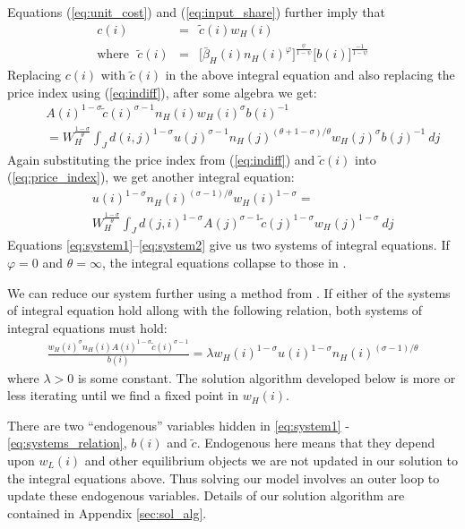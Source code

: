 \documentclass{article}
\begin{document}
Equations (\ref{eq:unit_cost}) and (\ref{eq:input_share}) further imply that 
\begin{eqnarray}\label{eq:ctilde}
	c(i) & = & \tilde{c}(i) w_H(i) \nonumber \\
    \mbox{where}~~~ \tilde{c}(i) & = & 
	\Big[\bar{\beta}_H(i) n_H(i)^{\varphi}\Big] ^{\frac{\psi}{1-\psi}} \Big[b(i)\Big]^{\frac{-1}{1-\psi}}
\end{eqnarray}
Replacing $c(i)$ with $\tilde{c}(i)$ in the above integral equation and also replacing the price index using (\ref{eq:indiff}), after some algebra we get:
\begin{eqnarray}\label{eq:system1}
	& & A(i)^{1-\sigma} \tilde{c}(i)^{\sigma-1} n_H(i)  w_H(i)^{\sigma}  b(i)^{-1}  \nonumber \\
	& & =  
    W_H^{\frac{1-\sigma}{\theta}}
	\int_J d(i,j)^{1-\sigma} u(j)^{\sigma-1} n_H(j)^{(\theta+1-\sigma)/\theta} w_H(j)^{\sigma} b(j)^{-1}  ~dj
\end{eqnarray}
Again substituting the price index from (\ref{eq:indiff}) and $\tilde{c}(i)$ into (\ref{eq:price_index}), we get another integral equation: 
\begin{eqnarray}\label{eq:system2}
 	& &  u(i)^{1-\sigma} n_H(i)^{(\sigma-1)/\theta} w_H(i)^{1-\sigma}  = \nonumber \\ 
 	& & 
    W_H^{\frac{1-\sigma}{\theta}}
 	\int_J  d(j,i)^{1-\sigma} A(j)^{\sigma-1}  \tilde{c}(j)^{1-\sigma} w_H(j)^{1-\sigma}
 	~ dj
\end{eqnarray}
Equations \ref{eq:system1}--\ref{eq:system2} give us two systems of integral equations. If $\varphi=0$ and $\theta=\infty$, the integral equations collapse to those in \citet{allen2014trade}. 

We can reduce our system further using a method from \citet{allen2014trade}.  If either of the systems of integral equation hold allong with the following relation, both systems of integral equations must hold:
\begin{eqnarray}\label{eq:systems_relation}
	\frac{w_H(i)^{\sigma}n_H(i)A(i)^{1-\sigma}\tilde{c}(i)^{\sigma-1}}{b(i)} = \lambda w_H(i)^{1-\sigma} u(i)^{1-\sigma} n_H(i)^{(\sigma-1)/\theta}
\end{eqnarray}
where $\lambda > 0$ is some constant.  The solution algorithm developed below is more or less iterating until we find a fixed point in $w_H(i)$.

There are two ``endogenous'' variables hidden in \eqref{eq:system1} - \eqref{eq:systems_relation}, $b(i)$ and $\tilde{c}$. Endogenous here means that they depend upon $w_L(i)$ and other equilibrium objects we are not updated in our solution to the integral equations above.  Thus solving our model involves an outer loop to update these endogenous variables.  Details of our solution algorithm are contained in Appendix \ref{sec:sol_alg}.
\end{document}
